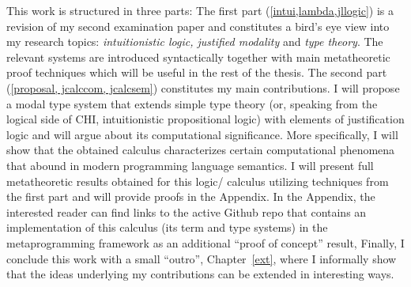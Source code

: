            This work  is structured in three parts: 
           The first part (\cref{intui,lambda,jllogic}) is a revision of my second examination paper and constitutes 
           a bird's eye view into my 
           research topics:  
           \emph{intuitionistic logic, justified modality} and \emph{type theory}. 
           The relevant systems are introduced syntactically together with main 
            metatheoretic proof techniques which will be useful 
           in the rest of the thesis.
           The second part (\cref{proposal, jcalccom, jcalcsem}) 
           constitutes my main contributions.
           I will propose  
           a modal type system that extends simple type theory
            (or, speaking from the logical side of \ac{CHI}, 
           intuitionistic propositional logic) with elements of
            justification logic and will argue about its computational significance. 
            More specifically, I will show  
           that the obtained calculus characterizes  certain 
           computational phenomena that abound in modern programming language semantics. 
           I will present full metatheoretic
           results obtained for this logic/ calculus utilizing techniques from the first part 
           and will provide proofs in the Appendix. 
           In the Appendix, the interested reader can find links to the active Github repo 
           that contains an implementation of  this calculus 
           (its term and type systems)
           in the metaprogramming framework  
           as an additional  ``proof of concept'' result,  
           Finally, I conclude this work with a small ``outro'', Chapter~\ref{ext},
           where I informally show that the ideas underlying my contributions 
           can be extended in interesting ways.



